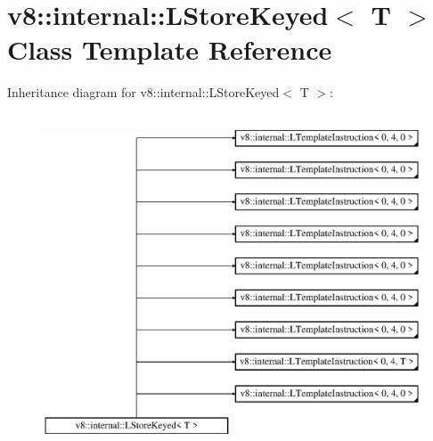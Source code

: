 \hypertarget{classv8_1_1internal_1_1_l_store_keyed}{}\section{v8\+:\+:internal\+:\+:L\+Store\+Keyed$<$ T $>$ Class Template Reference}
\label{classv8_1_1internal_1_1_l_store_keyed}
Inheritance diagram for v8\+:\+:internal\+:\+:L\+Store\+Keyed$<$ T $>$\+:\begin{figure}[H]
\begin{center}
\leavevmode
\includegraphics[height=10.000000cm]{classv8_1_1internal_1_1_l_store_keyed}
\end{center}
\end{figure}
